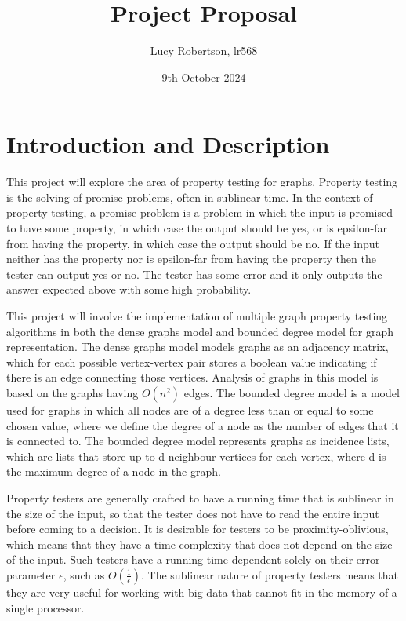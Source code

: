 \documentclass[11pt,a4paper]{article}
\begin{document}
\title{Project Proposal}
\date{9th October 2024}
\author{Lucy Robertson, lr568}
\maketitle
\section{Introduction and Description}
This project will explore the area of property testing for graphs. Property testing is the solving of promise problems, often in sublinear time. In the context of property testing, a promise problem is a problem in which the input is promised to have some property, in which case the output should be yes, or is epsilon-far from having the property, in which case the output should be no. If the input neither has the property nor is epsilon-far from having the property then the tester can output yes or no. The tester has some error and it only outputs the answer expected above with some high probability.

This project will involve the implementation of multiple graph property testing algorithms in both the dense graphs model and bounded degree model for graph representation. The dense graphs model models graphs as an adjacency matrix, which for each possible vertex-vertex pair stores a boolean value indicating if there is an edge connecting those vertices. Analysis of graphs in this model is based on the graphs having \(O(n^2)\) edges. The bounded degree model is a model used for graphs in which all nodes are of a degree less than or equal to some chosen value, where we define the degree of a node as the number of edges that it is connected to. The bounded degree model represents graphs as incidence lists, which are lists that store up to d neighbour vertices for each vertex, where d is the maximum degree of a node in the graph.

Property testers are generally crafted to have a running time that is sublinear in the size of the input, so that the tester does not have to read the entire input before coming to a decision. It is desirable for testers to be proximity-oblivious, which means that they have a time complexity that does not depend on the size of the input. Such testers have a running time dependent solely on their error parameter \(\epsilon\), such as \(O(\frac{1}{\epsilon})\). The sublinear nature of property testers means that they are very useful for working with big data that cannot fit in the memory of a single processor.
\end{document}
